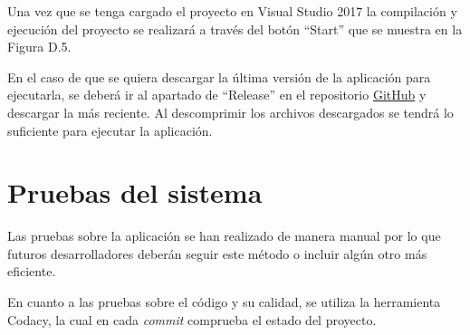 Una vez que se tenga cargado el proyecto en Visual Studio 2017 la compilación y ejecución del proyecto se realizará a través del botón ``Start'' que se muestra en la Figura D.5.


En el caso de que se quiera descargar la última versión de la aplicación para ejecutarla, se deberá ir al apartado de ``Release'' en el repositorio \href{https://github.com/FranBurgos/TFG/releases}{GitHub} y descargar la más reciente. Al descomprimir los archivos descargados se tendrá lo suficiente para ejecutar la aplicación.

\section{Pruebas del sistema}

Las pruebas sobre la aplicación se han realizado de manera manual por lo que futuros desarrolladores deberán seguir este método o incluir algún otro más eficiente.

En cuanto a las pruebas sobre el código y su calidad, se utiliza la herramienta Codacy, la cual en cada \textit{commit} comprueba el estado del proyecto.
